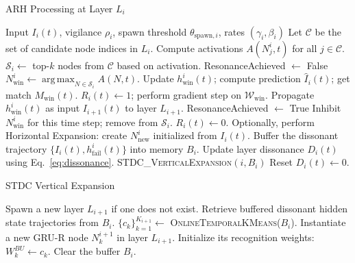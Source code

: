 \documentclass{article}
\DeclareMathOperator*{\argmax}{arg\,max}
\begin{document}
\begin{algorithm}
\caption{ARH Processing at Layer $L_i$}\label{alg:arh_cycle}
\begin{algorithmic}[1]
\Require Input $I_i(t)$, vigilance $\rho_i$, spawn threshold $\theta_{\text{spawn},i}$, rates $(\gamma_i, \beta_i)$
\State Let $\mathcal{C}$ be the set of candidate node indices in $L_i$.
\State Compute activations $A(N_j^i, t)$ for all $j \in \mathcal{C}$.
\State $\mathcal{S}_i \leftarrow$ top-$k$ nodes from $\mathcal{C}$ based on activation.
\State ResonanceAchieved $\leftarrow$ False
    \State $N_{\text{win}}^i \leftarrow \argmax_{N \in \mathcal{S}_i} A(N, t)$.
    \State Update $h_{\text{win}}^i(t)$; compute prediction $\hat{I}_i(t)$; get match $M_{\text{win}}(t)$.
     
        \State $R_i(t) \leftarrow 1$; perform gradient step on $\mathcal{W}_{\text{win}}$.
        \State Propagate $h_{\text{win}}^i(t)$ as input $I_{i+1}(t)$ to layer $L_{i+1}$.
        \State ResonanceAchieved $\leftarrow$ True
    \Else {}
        \State Inhibit $N_{\text{win}}^i$ for this time step; remove from $\mathcal{S}_i$.
    \EndIf
\EndWhile
{} 
    \State $R_i(t) \leftarrow 0$.
    \State Optionally, perform Horizontal Expansion: create $N_{\text{new}}^i$ initialized from $I_i(t)$.
    \State Buffer the dissonant trajectory $\{I_i(t), h_{\text{fail}}^i(t)\}$ into memory $B_i$.
\EndIf
\State Update layer dissonance $D_i(t)$ using Eq.~\eqref{eq:dissonance}.
 
    \State \textsc{STDC\_VerticalExpansion}$(i, B_i)$
    \State Reset $D_i(t) \leftarrow 0$.
\EndIf
\end{algorithmic}
\end{algorithm}

\begin{algorithm}
\caption{STDC Vertical Expansion}\label{alg:vertical_expansion}
\begin{algorithmic}[1]
    \State Spawn a new layer $L_{i+1}$ if one does not exist.
    \State Retrieve buffered dissonant hidden state trajectories from $B_i$.
    \State $\{c_k\}_{k=1}^{K_{i+1}} \leftarrow$ \textsc{OnlineTemporalKMeans}($B_i$). 
        \State Instantiate a new GRU-R node $N_k^{i+1}$ in layer $L_{i+1}$.
        \State Initialize its recognition weights: $W_k^{BU} \leftarrow c_k$.
    \EndFor
    \State Clear the buffer $B_i$.
\EndProcedure
\end{algorithmic}
\end{algorithm}
\end{document}

